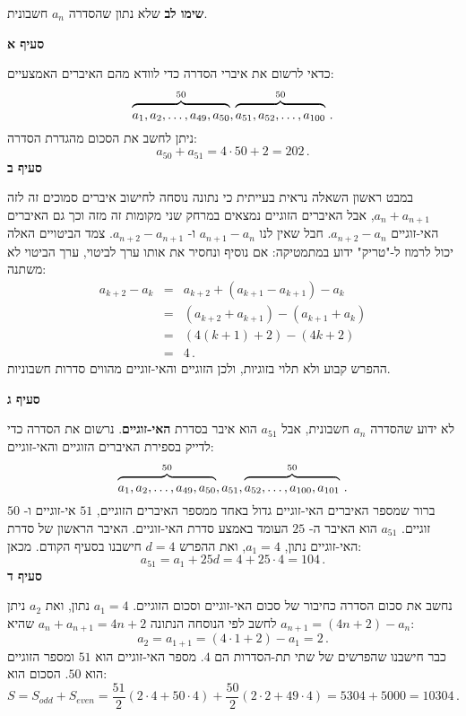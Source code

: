 \textbf{שימו לב}
שלא נתון שהסדרה
$a_n$
חשבונית.

\textbf{סעיף א}

כדאי לרשום את איברי הסדרה כדי לוודא מהם האיברים האמצעיים:
\[
\overbrace{\rule{0pt}{8pt}a_1, a_2, \ldots, a_{49}, a_{50}}^{50}, \overbrace{\rule{0pt}{8pt}a_{51}, a_{52},\ldots, a_{100}}^{50}\,.
\]
ניתן לחשב את הסכום מהגדרת הסדרה:
\[
a_{50}+a_{51}=4\cdot 50+2=202\,.
\]
\textbf{סעיף ב}

במבט ראשון השאלה נראית בעייתית כי נתונה נוסחה לחישוב איברים סמוכים זה לזה
$a_n+a_{n+1}$,
אבל האיברים הזוגיים נמצאים במרחק שני מקומות זה מזה וכך גם האיברים האי-זוגיים
$a_{n+2}-a_{n}$.
חבל שאין לנו
$a_{n+1}-a_{n}$
ו-%
$a_{n+2}-a_{n+1}$.
צמד הביטויים האלה יכול לרמוז ל-"טריק" ידוע במתמטיקה: אם נוסיף ונחסיר את אותו ערך לביטוי, ערך הביטוי לא משתנה:
\begin{eqnarray*}
a_{k+2} - a_{k} &=& a_{k+2}+(a_{k+1}-a_{k+1})-a_{k}\\
&=& (a_{k+2}+a_{k+1})-(a_{k+1}+a_{k})\\
&=& (4(k+1)+2)-(4k+2)\\
&=&4\,.
\end{eqnarray*}
ההפרש קבוע ולא תלוי בזוגיות, ולכן הזוגיים והאי-זוגיים מהווים סדרות חשבוניות.

\np

\textbf{סעיף ג}

לא ידוע שהסדרה
$a_{n}$
חשבונית, אבל
$a_{51}$
הוא איבר בסדרת
\textbf{האי-זוגיים}.
נרשום את הסדרה כדי לדייק בספירת האיברים הזוגיים והאי-זוגיים:
\[
\overbrace{\rule{0pt}{8pt}a_1, a_2, \ldots, a_{49}, a_{50}}^{50}, a_{51}, \overbrace{\rule{0pt}{8pt}a_{52}, \ldots, a_{100}, a_{101}}^{50}\,.
\]
ברור שמספר האיברים האי-זוגיים גדול באחד ממספר האיברים הזוגיים,
$51$
אי-זוגיים ו-%
$50$
זוגיים. 
$a_{51}$
הוא האיבר ה-%
$25$
העומד באמצע סדרת האי-זוגיים. האיבר הראשון של סדרת האי-זוגיים נתון,
$a_1=4$,
ואת ההפרש
$d=4$
חישבנו בסעיף הקודם. מכאן:
\[
a_{51}=a_1+25d =4+25\cdot 4=104\,.
\]
\textbf{סעיף ד}

נחשב את סכום הסדרה כחיבור של סכום האי-זוגיים וסכום הזוגיים.
$a_1=4$
נתון, ואת
$a_2$
ניתן לחשב לפי הנוסחה הנתונה
$a_n+a_{n+1}=4n+2$
שהיא
$a_{n+1}=(4n+2)-a_n$:
\[
a_2=a_{1+1}=(4\cdot 1+2)-a_1=2\,.
\]
כבר חישבנו שהפרשים של שתי תת-הסדרות הם 
$4$.
מספר האי-זוגיים הוא
$51$
ומספר הזוגיים הוא
$50$.
הסכום הוא:
\[
S=S_{\mathit{odd}} + S_{\mathit{even}}=\frac{51}{2}(2\cdot 4+50\cdot 4)+\frac{50}{2}(2\cdot 2+49\cdot 4)=5304+5000=10304\,.
\]

\np

